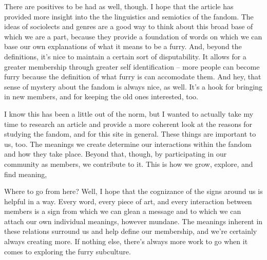 There are positives to be had as well, though. I hope that the article has provided more insight into the the linguistics and semiotics of the fandom. The ideas of sociolects and genres are a good way to think about this broad base of which we are a part, because they provide a foundation of words on which we can base our own explanations of what it means to be a furry. And, beyond the definitions, it's nice to maintain a certain sort of disputability. It allows for a greater membership through greater self identification -- more people can become furry because the definition of what furry is can accomodate them. And hey, that sense of mystery about the fandom is always nice, as well. It's a hook for bringing in new members, and for keeping the old ones interested, too.

I know this has been a little out of the norm, but I wanted to actually take my time to research an article and provide a more coherent look at the reasons for studying the fandom, and for this site in general. These things are important to us, too. The meanings we create determine our interactions within the fandom and how they take place. Beyond that, though, by participating in our community as members, we contribute to it. This is how we grow, explore, and find meaning,

Where to go from here? Well, I hope that the cognizance of the signs around us is helpful in a way. Every word, every piece of art, and every interaction between members is a sign from which we can glean a message and to which we can attach our own individual meanings, however mundane. The meanings inherent in these relations surround us and help define our membership, and we're certainly always creating more. If nothing else, there's always more work to go when it comes to exploring the furry subculture.


